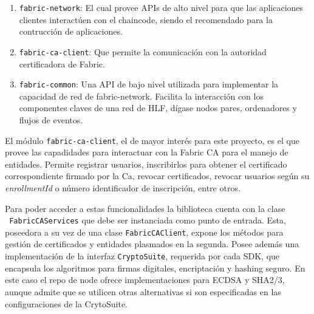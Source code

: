 \begin{enumerate}
	\item \texttt{fabric-network}: El cual provee APIs de alto nivel para que las aplicaciones clientes interact\'uen con el chaincode, siendo el recomendado para la contrucci\'on de aplicaciones.
	
	\item \texttt{fabric-ca-client}: Que permite la comunicaci\'on con la autoridad certificadora de Fabric.
	
	\item \texttt{fabric-common}: Una API de bajo nivel utilizada para implementar la capacidad de red de fabric-network. Facilita la interacci\'on con los componentes claves de una red de HLF, d\'igase nodos pares, ordenadores y flujos de eventos.
\end{enumerate}


El m\'odulo \texttt{fabric-ca-client}, el de mayor inter\'es para este proyecto, es el que provee las capadidades para interactuar con la Fabric CA para el manejo de entidades.  Permite registrar usuarios, inscribirlos para obtener el certificado correspondiente firmado por la Ca,  revocar certificados, revocar usuarios seg\'un su \emph{enrollmentId} o n\'umero identificador de inscripci\'on, entre otros.

Para poder acceder a estas funcionalidades la biblioteca cuenta con la clase 
\\
\texttt{ FabricCAServices} que debe ser instanciada como punto de entrada. Esta, poseedora a su vez de una clase \texttt{FabricCAClient}, expone los m\'etodos para gesti\'on de certificados y entidades plasmados en la segunda. Posee adem\'as una implementaci\'on de la interfaz \texttt{CryptoSuite}, requerida por cada SDK, que encapsula los algoritmos para firmas digitales, encriptaci\'on y hashing seguro. En este caso el repo de node ofrece implementaciones para ECDSA y SHA2/3, aunque admite que se utilicen otras alternativas si son especificadas en las configuraciones de la CrytoSuite.




